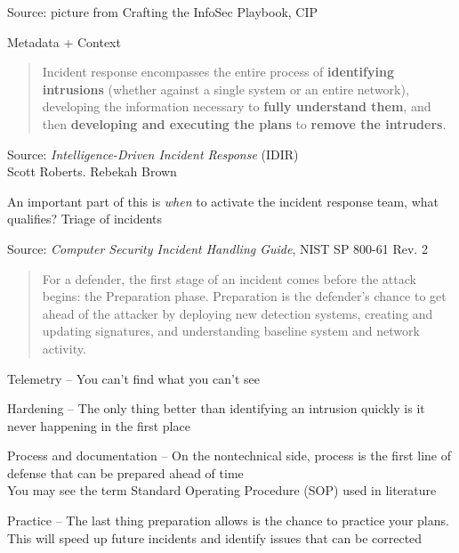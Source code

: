 \documentclass[Screen16to9,17pt]{foils}
\begin{document}
Source: picture from Crafting the InfoSec Playbook, CIP

Metadata + Context








\begin{quote}
Incident response encompasses the entire process of {\bf identifying intrusions} (whether against a single system or an entire network), developing the information necessary to {\bf fully understand them}, and then {\bf developing and executing the plans} to {\bf remove the intruders}.
\end{quote}
Source: \emph{Intelligence-Driven Incident Response} (IDIR)\\
 Scott Roberts. Rebekah Brown


\begin{list2}
\item An important part of this is \emph{when} to activate the incident response team, what qualifies? Triage of incidents
\end{list2}



Source: \emph{Computer Security Incident Handling Guide}, NIST SP 800-61 Rev. 2






\begin{quote}
For a defender, the first stage of an incident comes before the attack begins: the Preparation phase. Preparation is the defender’s chance to get ahead of the attacker by deploying new detection systems, creating and updating signatures, and understanding baseline system and network activity.
\end{quote}

\begin{list2}
\item Telemetry -- You can’t find what you can’t see
\item Hardening -- The only thing better than identifying an intrusion quickly is it never happening in the first place
\item Process and documentation -- On the nontechnical side, process is the first line of defense that can be prepared ahead of time\\
You may see the term Standard Operating Procedure (SOP) used in literature
\item Practice -- The last thing preparation allows is the chance to practice your plans. This will speed up future incidents and identify issues that can be corrected
\end{list2}
\end{document}
